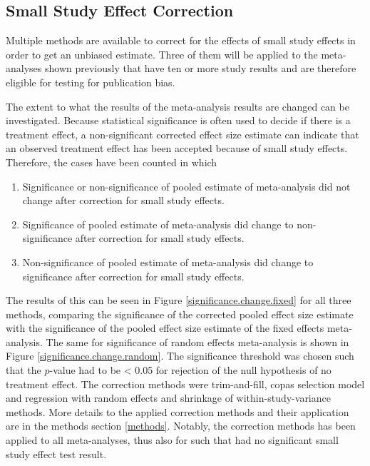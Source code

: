 \documentclass[11pt,a4paper,twoside]{book}\usepackage[]{graphicx}\usepackage[]{color}
\begin{document}
\subsection{Small Study Effect Correction}
Multiple methods are available to correct for the effects of small study effects in order to get an unbiased estimate. Three of them will be applied to the meta-analyses shown previously that have ten or more study results and are therefore eligible for testing for publication bias. 

\vspace{0mm}
The extent to what the results of the meta-analysis results are changed can be investigated. Because statistical significance is often used to decide if there is a treatment effect, a non-significant corrected effect size estimate can indicate that an observed treatment effect has been accepted because of small study effects. Therefore, the cases have been counted in which 
\begin{enumerate}
\item Significance or non-significance of pooled estimate of meta-analysis did not change after correction for small study effects.
\item Significance of pooled estimate of meta-analysis did change to non-significance after correction for small study effects.
\item Non-significance of pooled estimate of meta-analysis did change to significance after correction for small study effects.
\end{enumerate}

The results of this can be seen in Figure \ref{significance.change.fixed} for all three methods, comparing the significance of the corrected pooled effect size estimate with the significance of the pooled effect size estimate of the fixed effects meta-analysis. The same for significance of random effects meta-analysis is shown in Figure \ref{significance.change.random}. The significance threshold was chosen such that the $p$-value had to be < 0.05 for rejection of the null hypothesis of no treatment effect. The correction methods were trim-and-fill, copas selection model and regression with random effects and shrinkage of within-study-variance methods. More details to the applied correction methods and their application are in the methods section \ref{methods}. Notably, the correction methods has been applied to all meta-analyses, thus also for such that had no significant small study effect test result. 
\end{document}
